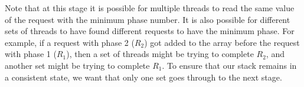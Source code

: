 \documentclass{llncs}
\begin{document}
\begin{comment}
\vspace{-5mm}
\begin{algorithm}
\scriptsize
\SetAlgoLined
\textbf{clean}($tid$, $node$){}\\
$phase$ $\leftarrow$ $deletePhase.getAndIncrement$()\\
$request$ $\leftarrow$  $new$ DeleteRequest($phase$, $tid$, $true$, $node$) \\
$allDeleteRequests$[$tid$] $\leftarrow$  $request$ \label{line:alldel}\\
$helpDelete$($request$)\\


\textbf{helpDelete}($request$){}\\
			($minTid$, $minReq$)  $\leftarrow$ $min_{req.phase}$ \{ $i$, $req$ $\mid$ $0 \le i < N$, $req$ = $allDeleteRequests[i]$,
$req.pending$ = \textbf{true} \} \\
			\If{($minReq == null$) $\mid\mid$ ($minReq.phase$ $>$ $request.phase$)}{
				break
			}
			$uniqueDelete$($minReq$) \\
			\If{$minReq \ne request$} {
				$uniqueDelete(request)$
			}
\caption{$clean$ and $helpDelete$ methods} \label{alg:clean}
\end{algorithm}
\end{comment}
\begin{comment}
\vspace{-5mm}	
\begin{algorithm}
\scriptsize
\SetAlgoLined
\textbf{uniqueDelete}($request$){}\\
		\While{$request.pending$}
		{
			$currRequest$ $\leftarrow$ $uniqueRequest.get$()\\
			\If{!$currRequest.pending$ \label{line:deluniquepending} }
			{
				\If{$request.pending$}
				{
					$stat$ $\leftarrow$ ($request \ne currRequest$) ? $uniqueRequest$.$compareAndSet$ ($currRequest$,
$request$) :
\textbf{true} \label{line:cleanCAS}\\
					$helpFinishDelete$()\\
					\If{$stat$} {
						$return$
					}
				}
			}
		\Else{
				$helpFinishDelete$()
			}
		}
\caption{The $uniqueDelete$ method} \label{alg:clean2}
\end{algorithm}
\end{comment}


Note that at this stage it is possible for multiple threads to read the same value of the request with the 
minimum phase number. It is also possible for different sets of threads to have found different requests
to have the minimum phase. For example, if a request with phase 2 ($R_2$) got added to the array before the 
request with phase 1 ($R_1$), then a set of threads might be trying to complete $R_2$, and another set might 
be trying to complete $R_1$. To ensure that our stack remains in a consistent state, we want that only one 
set goes through to the next stage.
\end{document}
